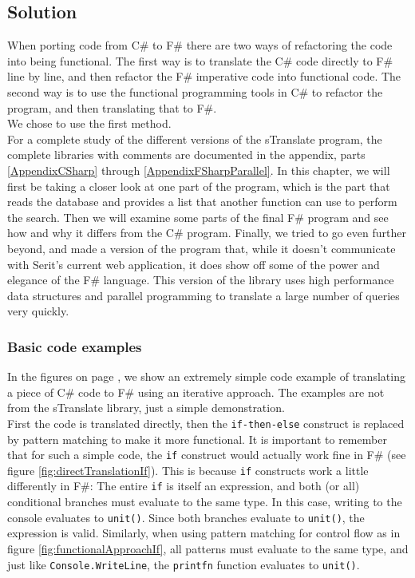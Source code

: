 \documentclass[12pt, a4paper]{article}
\newcommand{\code}[1]{{\small \texttt{#1}}}
\begin{document}
\newpage

\subsection{Solution}
\label{Solution}
When porting code from C\# to F\# there are two ways of refactoring the code into being functional. The first way is to translate the C\# code directly to F\# line by line, and then refactor the F\# imperative code into functional code. The second way is to use the functional programming tools in C\# to refactor the program, and then translating that to F\#.\\

We chose to use the first method.\\

For a complete study of the different versions of the sTranslate program, the complete libraries with comments are documented in the appendix, parts \ref{AppendixCSharp} through \ref{AppendixFSharpParallel}. In this chapter, we will first be taking a closer look at one part of the program, which is the part that reads the database and provides a list that another function can use to perform the search. Then we will examine some parts of the final F\# program and see how and why it differs from the C\# program. Finally, we tried to go even further beyond, and made a version of the program that, while it doesn't communicate with Serit's current web application, it does show off some of the power and elegance of the F\# language. This version of the library uses high performance data structures and parallel programming to translate a large number of queries very quickly.

\newpage

\subsubsection{Basic code examples}
In the figures on page \pageref{fig:CSharpIf}, we show an extremely simple code example of translating a piece of C\# code to F\# using an iterative approach. The examples are not from the sTranslate library, just a simple demonstration.\\

First the code is translated directly, then the \code{if-then-else} construct is replaced by pattern matching to make it more functional. It is important to remember that for such a simple code, the \code{if} construct would actually work fine in F\# (see figure \ref{fig:directTranslationIf}). This is because \code{if} constructs work a little differently in F\#: The entire \code{if} is itself an expression, and both (or all) conditional branches must evaluate to the same type. In this case, writing to the console evaluates to \code{unit()}. Since both branches evaluate to \code{unit()}, the expression is valid. Similarly, when using pattern matching for control flow as in figure \ref{fig:functionalApproachIf}, all patterns must evaluate to the same type, and just like \code{Console.WriteLine}, the \code{printfn} function evaluates to \code{unit()}.\\
\end{document}
